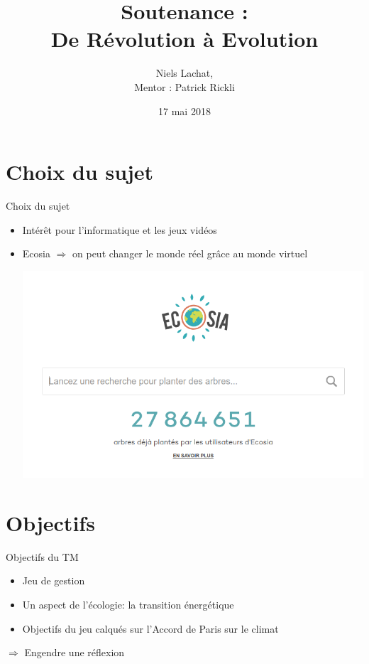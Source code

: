 \documentclass[11pt]{beamer}
\author{Niels Lachat, \\ Mentor : Patrick Rickli}
\title{Soutenance : \\ De Révolution à Evolution}
\institute{Lycée Denis-de-Rougemont}
\date{17 mai 2018}
\newcommand{\pauseditemize}{\pause \begin{itemize}[<+->]}
\begin{document}
\begin{frame}
\titlepage
\end{frame}

\begin{frame}
\tableofcontents
\end{frame}

\section{Choix du sujet}

\begin{frame}{Choix du sujet}

\pauseditemize
	\item Intérêt pour l'informatique et les jeux vidéos
	\item Ecosia $\Rightarrow$ on peut changer le monde réel grâce au monde virtuel
	\begin{center}
		\includegraphics[scale=.25]{../images/ecosia}
	\end{center}
\end{itemize}

\end{frame}

\section{Objectifs}

\begin{frame}{Objectifs du TM}

\pauseditemize
	\item Jeu de gestion
	\item Un aspect de l'écologie: la transition énergétique
	\item Objectifs du jeu calqués sur l'Accord de Paris sur le climat
\end{itemize}
\pause
\begin{center}
$\Rightarrow$ Engendre une réflexion
\end{center}
	
\end{frame}
\end{document}
